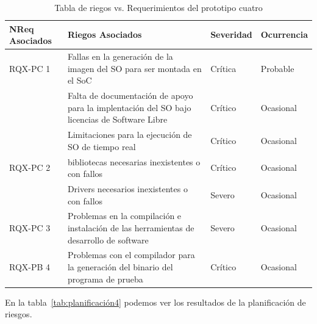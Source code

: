 		\begin{table}[h!]
		\centering
		\begin{tabular}{ p{2.5cm} p{9cm} p{1.5cm} p{2cm} }
		\hline 
		\rowcolor[gray]{0.8} N\textordmasculine Req Asociados  & Riegos Asociados & Severidad  & Ocurrencia \\
		\hline RQX-PC 1 & Fallas en la generación de la imagen del SO para ser montada en el SoC & Crítica       & Probable \\
		\hline			& Falta de documentación de apoyo para la implentación del SO bajo licencias de Software Libre & Crítico & Ocasional\\	
		\hline			& Limitaciones para la ejecución de SO de tiempo real & Crítico & Ocasional\\	
 		\hline RQX-PC 2 & bibliotecas necesarias inexistentes o con fallos& Crítico & Ocasional\\	
		\hline			& Drivers necesarios inexistentes o con fallos  & Severo  &  Ocasional\\ 
		\hline RQX-PC 3	& Problemas en la compilación e instalación de las herramientas de desarrollo de software& Severo  &  Ocasional\\ 
		\hline RQX-PB 4 & Problemas con el compilador para la generación del binario del programa de prueba  & Crítico&  Ocasional\\
		\hline
		\end{tabular}
		\caption{Tabla de riegos vs. Requerimientos del prototipo cuatro}
		\label{tab:riegos4}
		\end{table}

En la tabla~\ref{tab:planificación4} podemos ver los resultados de la planificación de riesgos.

